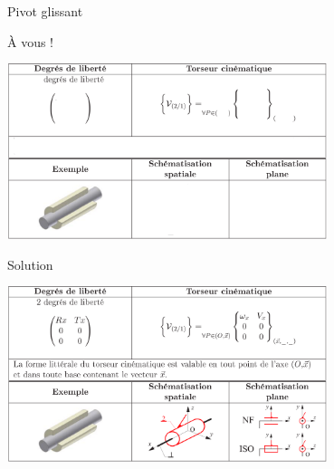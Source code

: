 \documentclass[
  ignorenonframetext,
  aspectratio=169,
  c]{beamer}
\begin{document}
\begin{frame}{Pivot glissant}
\label{pivot-glissant}
\begin{block}{À vous !}
\begin{center}
\includegraphics[width=0.7\textwidth,height=\textheight]{CM3/Liaison-Pivot-glissant-00.png}
\end{center}
\end{block}

\begin{block}{Solution}
\begin{center}
\includegraphics[width=0.7\textwidth,height=\textheight]{CM3/Liaison-Pivot-glissant-01.png}
\end{center}
\end{block}
\end{frame}
\end{document}
